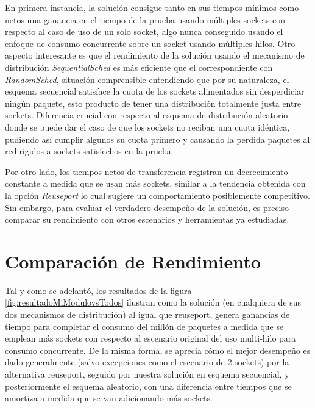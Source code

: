 En primera instancia, la solución consigue tanto en sus tiempos mínimos como netos una ganancia en el tiempo de la prueba usando múltiples sockets con respecto al caso de uso de un solo socket, algo nunca conseguido usando el enfoque de consumo concurrente sobre un socket usando múltiples hilos. Otro aspecto interesante es que el rendimiento de la solución usando el mecanismo de distribución \emph{SequentialSched} es más eficiente que el correspondiente con \emph{RandomSched}, situación comprensible entendiendo que por su naturaleza, el esquema secuencial satisface la cuota de los sockets alimentados sin desperdiciar ningún paquete, esto producto de tener una distribución totalmente justa entre sockets. Diferencia crucial con respecto al esquema de distribución aleatorio donde se puede dar el caso de que los sockets no reciban una cuota idéntica, pudiendo así cumplir algunos su cuota primero y causando la perdida paquetes al redirigidos a sockets satisfechos en la prueba.

Por otro lado, los tiempos netos de transferencia registran un decrecimiento constante a medida que se usan más sockets, similar a la tendencia obtenida con la opción \emph{Reuseport} lo cual sugiere un comportamiento posiblemente competitivo. Sin embargo, para evaluar el verdadero desempeño de la solución, es preciso comparar su rendimiento con otros escenarios y herramientas ya estudiadas.

\section{Comparación de Rendimiento}

Tal y como se adelantó, los resultados de la figura \ref{fig:resultadoMiModulovsTodos} ilustran como la solución (en cualquiera de sus dos mecanismos de distribución) al igual que reuseport, genera ganancias de tiempo para completar el consumo del millón de paquetes a medida que se emplean más sockets con respecto al escenario original del uso multi-hilo para consumo concurrente. De la misma forma, se aprecia cómo el mejor desempeño es dado generalmente (salvo excepciones como el escenario de 2 sockets) por la alternativa reuseport, seguido por nuestra solución en esquema secuencial, y posteriormente el esquema aleatorio, con una diferencia entre tiempos que se amortiza a medida que se van adicionando más sockets.

